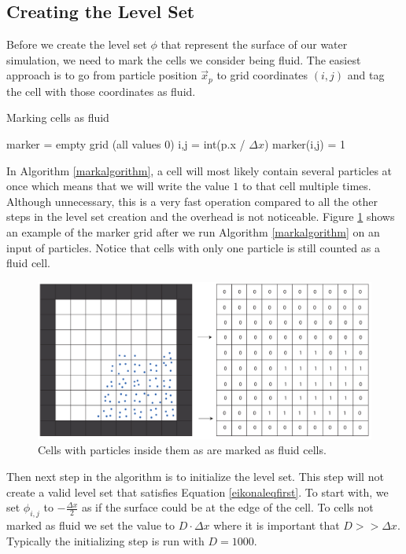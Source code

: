 \subsection{Creating the Level Set}

Before we create the level set $\phi$ that represent the surface of our water simulation, we need to mark the cells we consider being fluid. The easiest approach is to go from particle position $\vec{x}_p$ to grid coordinates $(i,j)$ and tag the cell with those coordinates as fluid.

\begin{algorithm}
\caption{Marking cells as fluid}
\begin{algorithmic}
\STATE marker = empty grid (all values 0)
\STATE i,j = int(p.x / $\Delta x$)
\STATE marker(i,j) = 1
\ENDFOR
\end{algorithmic}
\label{markalgorithm}
\end{algorithm}
\noindent
In Algorithm \ref{markalgorithm}, a cell will most likely contain several particles at once which means that we will write the value $1$ to that cell multiple times. Although unnecessary, this is a very fast operation compared to all the other steps in the level set creation and the overhead is not noticeable. Figure \ref{markerexample} shows an example of the marker grid after we run Algorithm \ref{markalgorithm} on an input of particles. Notice that cells with only one particle is still counted as a fluid cell.

\begin{figure}[ht!]
\centering
\includegraphics[width=130mm]{img/mark.pdf}
\caption{Cells with particles inside them as are marked as fluid cells.}
\label{markerexample}
\end{figure}
\noindent
Then next step in the algorithm is to initialize the level set. This step will not create a valid level set that satisfies Equation \ref{eikonaleqfirst}. To start with, we set $\phi_{i,j}$ to $-\frac{\Delta x}{2}$ as if the surface could be at the edge of the cell. To cells not marked as fluid we set the value to $D \cdot \Delta x$ where it is important that $D >> \Delta x$. Typically the initializing step is run with $D = 1000$.

